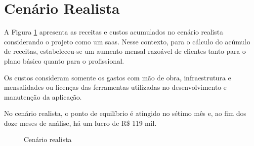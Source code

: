 \section{Cenário Realista}

A Figura \ref{fig:cenario-realista} apresenta as receitas e custos acumulados no cenário realista considerando o projeto como um \gls{saas}. Nesse contexto, para o cálculo do acúmulo de receitas, estabeleceu-se um aumento mensal razoável de clientes tanto para o plano básico quanto para o profissional.

Os custos consideram somente os gastos com mão de obra, infraestrutura e mensalidades ou licenças das ferramentas utilizadas no desenvolvimento e manutenção da aplicação.

No cenário realista, o ponto de equilíbrio é atingido no sétimo mês e, ao fim dos doze meses de análise, há um lucro de R\$ 119 mil.

\begin{figure}[h]
	\centering
	\caption{Cenário realista}
	\label{fig:cenario-realista}
\end{figure}